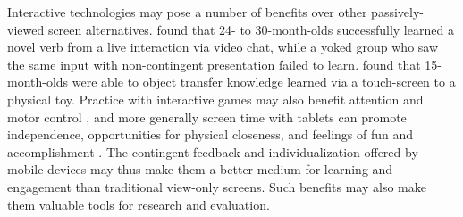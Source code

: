 \documentclass[man,noapacite]{apa2}
\begin{document}
Interactive technologies may pose a number of benefits over other passively-viewed screen alternatives.
 found that 24- to 30-month-olds successfully learned a novel verb from a live interaction via video chat, while a yoked group who saw the same input with non-contingent presentation failed to learn.  found that 15-month-olds were able to object transfer knowledge learned via a touch-screen to a physical toy. Practice with interactive games may also benefit attention and motor control \cite{bavelier2010}, and more generally screen time with tablets can promote independence, opportunities for physical closeness, and feelings of fun and accomplishment \cite{rvachew2013}. The contingent feedback and individualization offered by mobile devices may thus make them a better medium for learning and engagement than traditional view-only screens. Such benefits may also make them valuable tools for research and evaluation.



\end{document}
